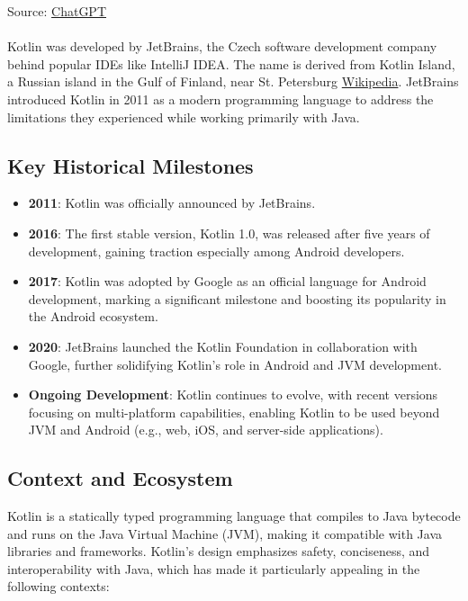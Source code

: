 Source: \href{https://chatgpt.com/share/672e6c5a-aa64-8007-93e5-aefa60cbe9fc}{ChatGPT}
\\
\\
Kotlin was developed by JetBrains, the Czech software development company behind popular IDEs like IntelliJ IDEA. The name is derived from Kotlin Island, a Russian island in the Gulf of Finland, near St. Petersburg 
\href{https://en.wikipedia.org/wiki/Kotlin_(programming_language)}{Wikipedia}. JetBrains introduced Kotlin in 2011 as a modern programming language to address the limitations they experienced while working primarily with Java.

\subsection{Key Historical Milestones}
\begin{itemize}
    \item \textbf{2011}: Kotlin was officially announced by JetBrains.
    \item \textbf{2016}: The first stable version, Kotlin 1.0, was released after five years of development, gaining traction especially among Android developers.
    \item \textbf{2017}: Kotlin was adopted by Google as an official language for Android development, marking a significant milestone and boosting its popularity in the Android ecosystem.
    \item \textbf{2020}: JetBrains launched the Kotlin Foundation in collaboration with Google, further solidifying Kotlin's role in Android and JVM development.
    \item \textbf{Ongoing Development}: Kotlin continues to evolve, with recent versions focusing on multi-platform capabilities, enabling Kotlin to be used beyond JVM and Android (e.g., web, iOS, and server-side applications).
\end{itemize}

\subsection{Context and Ecosystem}

Kotlin is a statically typed programming language that compiles to Java bytecode and runs on the Java Virtual Machine (JVM), making it compatible with Java libraries and frameworks. Kotlin’s design emphasizes safety, conciseness, and interoperability with Java, which has made it particularly appealing in the following contexts:

